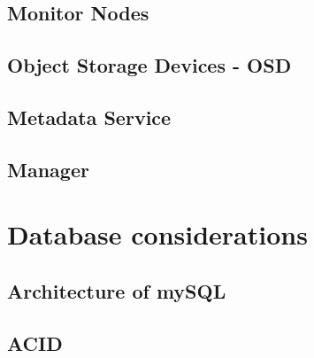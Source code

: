 \documentclass[titlepage, a4paper, 11pt]{scrartcl}
\begin{document}

        \subsection{Monitor Nodes}


        \subsection{Object Storage Devices - OSD}


        \subsection{Metadata Service}

        \subsection{Manager}
        
    \section{Database considerations}

        \subsection{Architecture of mySQL}


        \subsection{ACID}

\end{document}
